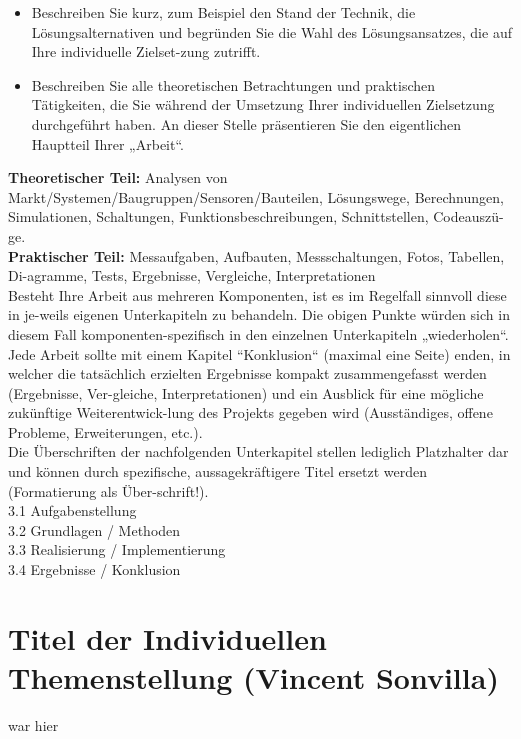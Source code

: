\documentclass[12pt]{article}
\begin{document}
\begin{itemize}
    \item Beschreiben Sie kurz, zum Beispiel den Stand der Technik, die Lösungsalternativen und begründen Sie die Wahl des Lösungsansatzes, die auf Ihre individuelle Zielset-zung zutrifft. 
    \item Beschreiben Sie alle theoretischen Betrachtungen und praktischen Tätigkeiten, die Sie während der Umsetzung Ihrer individuellen Zielsetzung durchgeführt haben. An dieser Stelle präsentieren Sie den eigentlichen Hauptteil Ihrer „Arbeit“.
\end{itemize}

\textbf{Theoretischer Teil:} Analysen von Markt/Systemen/Baugruppen/Sensoren/Bauteilen, Lösungswege, Berechnungen, Simulationen, Schaltungen, Funktionsbeschreibungen, Schnittstellen, Codeauszü-ge. \\
\textbf{Praktischer Teil:} Messaufgaben, Aufbauten, Messschaltungen, Fotos, Tabellen, Di-agramme, Tests, Ergebnisse, Vergleiche, Interpretationen\\
Besteht Ihre Arbeit aus mehreren Komponenten, ist es im Regelfall sinnvoll diese in je-weils eigenen Unterkapiteln zu behandeln. Die obigen Punkte würden sich in diesem Fall komponenten-spezifisch in den einzelnen Unterkapiteln „wiederholen“. \\
Jede Arbeit sollte mit einem Kapitel “Konklusion“ (maximal eine Seite) enden, in welcher die tatsächlich erzielten Ergebnisse kompakt zusammengefasst werden (Ergebnisse, Ver-gleiche, Interpretationen) und ein Ausblick für eine mögliche zukünftige Weiterentwick-lung des Projekts gegeben wird (Ausständiges, offene Probleme, Erweiterungen, etc.).\\
Die Überschriften der nachfolgenden Unterkapitel stellen lediglich Platzhalter dar und können durch spezifische, aussagekräftigere Titel ersetzt werden (Formatierung als Über-schrift!).\\
3.1 Aufgabenstellung\\
3.2 Grundlagen / Methoden\\
3.3 Realisierung / Implementierung\\
3.4 Ergebnisse / Konklusion\\

\color{black}
\newpage



\newpage
\section{Titel der Individuellen Themenstellung (Vincent Sonvilla)}
war hier
\newpage
\end{document}
